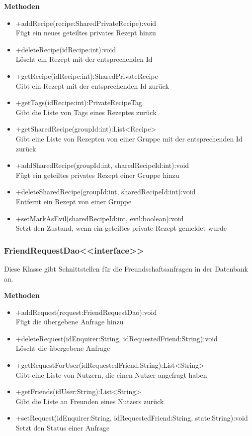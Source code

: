 \textbf{Methoden}
\begin{itemize}
	\item +addRecipe(recipe:SharedPrivateRecipe):void \\Fügt ein neues geteiltes privates Rezept hinzu
	\item +deleteRecipe(idRecipe:int):void \\Löscht ein Rezept mit der entsprechenden Id
	\item +getRecipe(idRecipe:int):SharedPrivateRecipe \\Gibt ein Rezept mit der entsprechenden Id zurück
	\item +getTags(idRecipe:int):PrivateRecipeTag \\Gibt die Liste von Tags eines Rezeptes zurück
	\item +getSharedRecipe(groupId:int):List<Recipe> \\Gibt eine Liste von Rezepten von einer Gruppe mit der entsprechenden Id zurück
	\item +addSharedRecipe(groupId:int, sharedRecipeId:int):void \\Fügt ein geteiltes privates Rezept einer Gruppe hinzu
	\item +deleteSharedRecipe(groupId:int, sharedRecipeId:int):void \\Entfernt ein Rezept von einer Gruppe
	\item +setMarkAsEvil(sharedRecipeId:int, evil:boolean):void \\Setzt den Zustand, wenn ein geteiltes private Rezept gemeldet wurde
\end{itemize}

\subsubsection{FriendRequestDao<<interface>>}
Diese Klasse gibt Schnittstellen für die Freundschaftsanfragen in der Datenbank an.

\textbf{Methoden}
\begin{itemize}
	\item +addRequest(request:FriendRequestDao):void \\Fügt die übergebene Anfrage hinzu
	\item +deleteRequest(idEnquirer:String, idRequestedFriend:String):void \\Löscht die übergebene Anfrage
	\item +getRequestForUser(idRequestedFriend:String):List<String> \\Gibt eine Liste von Nutzern, die einen Nutzer angefragt haben
	\item +getFriends(idUser:String):List<String> \\Gibt die Liste an Freunden eines Nutzers zurück
	\item +setRequest(idEnquirer:String, idRequestedFriend:String, state:String):void \\Setzt den Status einer Anfrage
\end{itemize}

